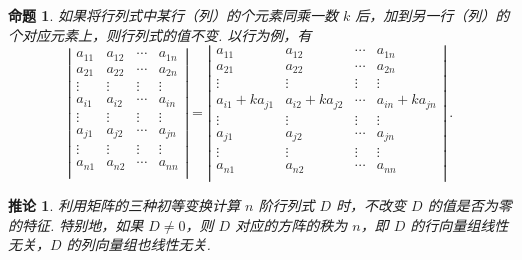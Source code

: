 \documentclass[zihao=-4,UTF8,linespread=1.8,nothm]{aytony_base}
\newtheorem*{proposition*}{\indent 命题}
\newtheorem*{corollary}{\indent 推论}
\begin{document}
\begin{proposition*}
    如果将行列式中某行（列）的个元素同乘一数 $k$ 后，加到另一行（列）的个对应元素上，则行列式的值不变. 以行为例，有 $$
        \left|
        \begin{matrix}
            a_{11} & a_{12} & \cdots & a_{1n} \\
            a_{21} & a_{22} & \cdots & a_{2n} \\
            \vdots & \vdots & \vdots & \vdots \\
            a_{i1} & a_{i2} & \cdots & a_{in} \\
            \vdots & \vdots & \vdots & \vdots \\
            a_{j1} & a_{j2} & \cdots & a_{jn} \\
            \vdots & \vdots & \vdots & \vdots \\
            a_{n1} & a_{n2} & \cdots & a_{nn} \\
        \end{matrix}
        \right| =  \left|
        \begin{matrix}
            a_{11}           & a_{12}           & \cdots & a_{1n}           \\
            a_{21}           & a_{22}           & \cdots & a_{2n}           \\
            \vdots           & \vdots           & \vdots & \vdots           \\
            a_{i1} + ka_{j1} & a_{i2} + ka_{j2} & \cdots & a_{in} + ka_{jn} \\
            \vdots           & \vdots           & \vdots & \vdots           \\
            a_{j1}           & a_{j2}           & \cdots & a_{jn}           \\
            \vdots           & \vdots           & \vdots & \vdots           \\
            a_{n1}           & a_{n2}           & \cdots & a_{nn}           \\
        \end{matrix}
        \right|\ .
    $$
\end{proposition*}

\begin{corollary}
    利用矩阵的三种初等变换计算 $n$ 阶行列式 $D$ 时，不改变 $D$ 的值是否为零的特征. 特别地，如果 $D \neq 0 $，则 $D$ 对应的方阵的秩为 $n$，即 $D$ 的行向量组线性无关，$D$ 的列向量组也线性无关.
\end{corollary}
\end{document}
